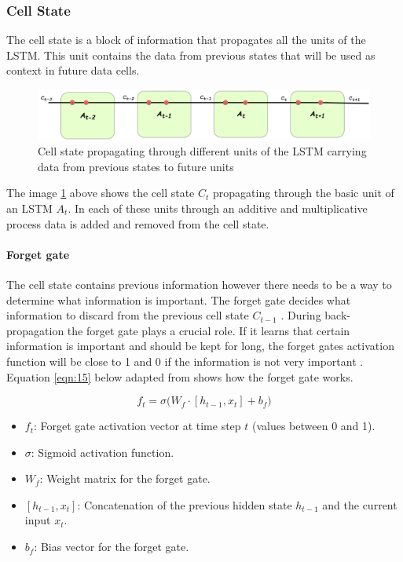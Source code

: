 \subsubsection{Cell State}
The cell state is a block of information that propagates all the units of the LSTM. This unit contains the data from previous states that will be used as context in future data cells. \\ 

\begin{figure}[h]
	\centering
	\includegraphics[width=1\linewidth,height=0.1\textwidth]{Chapters/images/cellstate}
	\caption{Cell state propagating through different units of the LSTM carrying data from previous states to future units}
	\label{fig:cellstate}
\end{figure} 

 The image \ref{fig:cellstate} above shows the cell state \textit{$C_{t}$} propagating through the basic unit of an LSTM \textit{$A_t$}. In each of these units through an additive and multiplicative process data is added and removed from the cell state. 
 \paragraph{Forget gate}
 
The cell state contains previous information however there needs to be a way to determine what information is important. The forget gate decides what information to discard from the previous cell state  \textit{$C_{t-1}$} \cite{zhu2025novel}. During back-propagation the forget gate plays a crucial role. If it learns that certain information is important and should be kept for long, the forget gates activation function will be close to 1 and 0 if the information is not very important \cite{zhu2025novel}. Equation \ref{eqn:15}  below adapted from \cite{colah2015understanding} shows how the forget gate works.

\[
f_t = \sigma \Big( W_f \cdot [h_{t-1}, x_t] + b_f \Big)
\tag{23}
\label{eqn:15}
\]
{\small
	\begin{itemize}
		\item $f_t$: Forget gate activation vector at time step $t$ (values between 0 and 1).
		\item $\sigma$: Sigmoid activation function.
		\item $W_f$: Weight matrix for the forget gate.
		\item $[h_{t-1}, x_t]$: Concatenation of the previous hidden state $h_{t-1}$ and the current input $x_t$.
		\item $b_f$: Bias vector for the forget gate.
	\end{itemize}
}

